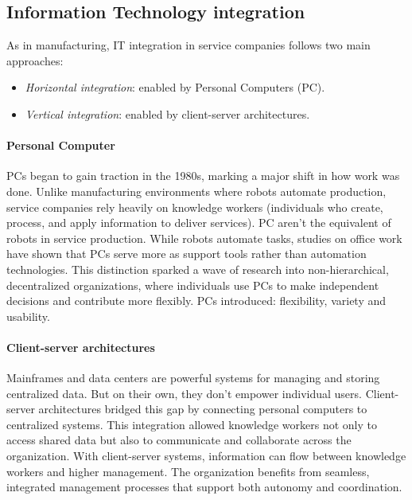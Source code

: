 \subsection{Information Technology integration}
As in manufacturing, IT integration in service companies follows two main approaches:
\begin{itemize}
    \item \textit{Horizontal integration}: enabled by Personal Computers (PC).
    \item \textit{Vertical integration}: enabled by client-server architectures. 
\end{itemize}

\paragraph*{Personal Computer}
PCs began to gain traction in the 1980s, marking a major shift in how work was done. 
Unlike manufacturing environments where robots automate production, service companies rely heavily on knowledge workers (individuals who create, process, and apply information to deliver services).
PC aren't the equivalent of robots in service production. 
While robots automate tasks, studies on office work have shown that PCs serve more as support tools rather than automation technologies.
This distinction sparked a wave of research into non-hierarchical, decentralized organizations, where individuals use PCs to make independent decisions and contribute more flexibly.
PCs introduced: flexibility, variety and usability. 

\paragraph*{Client-server architectures}
Mainframes and data centers are powerful systems for managing and storing centralized data.
But on their own, they don't empower individual users.
Client-server architectures bridged this gap by connecting personal computers to centralized systems.
This integration allowed knowledge workers not only to access shared data but also to communicate and collaborate across the organization.
With client-server systems, information can flow between knowledge workers and higher management. 
The organization benefits from seamless, integrated management processes that support both autonomy and coordination.


